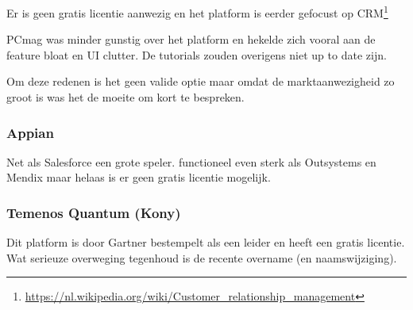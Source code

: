 Er is geen gratis licentie aanwezig en het platform is eerder gefocust op CRM\footnote{\url{https://nl.wikipedia.org/wiki/Customer_relationship_management}}

PCmag \autocite{bibid} was minder gunstig over het platform en hekelde zich vooral aan de feature bloat en UI clutter. De tutorials zouden overigens niet up to date zijn.

Om deze redenen is het geen valide optie maar omdat de marktaanwezigheid zo groot is was het de moeite om kort te bespreken.

\subsubsection{Appian}

Net als Salesforce een grote speler. functioneel even sterk als Outsystems en Mendix maar helaas is er geen gratis licentie mogelijk.

\subsubsection{Temenos Quantum (Kony)}

Dit platform is door Gartner bestempelt als een leider en heeft een gratis licentie. Wat serieuze overweging tegenhoud is de recente overname (en naamswijziging).